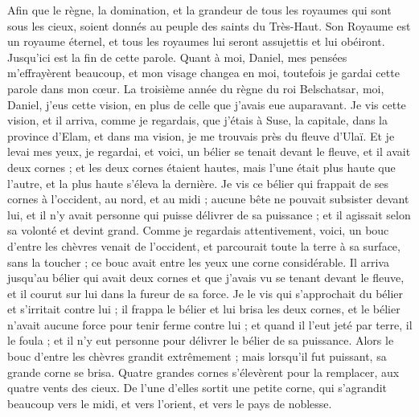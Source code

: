 \begin{multicols}{2}
Afin que le règne, la domination, et la grandeur de tous les royaumes qui sont sous les cieux, soient donnés au peuple des saints du Très-Haut. Son Royaume est un royaume éternel, et tous les royaumes lui seront assujettis et lui obéiront.
Jusqu'ici est la fin de cette parole. Quant à moi, Daniel, mes pensées m'effrayèrent beaucoup, et mon visage changea en moi, toutefois je gardai cette parole dans mon cœur.
\VerseOne{}La troisième année du règne du roi Belschatsar, moi, Daniel, j'eus cette vision, en plus de celle que j'avais eue auparavant.
Je vis cette vision, et il arriva, comme je regardais, que j'étais à Suse, la capitale, dans la province d'Elam, et dans ma vision, je me trouvais près du fleuve d'Ulaï.
Et je levai mes yeux, je regardai, et voici, un bélier se tenait devant le fleuve, et il avait deux cornes ; et les deux cornes étaient hautes, mais l'une était plus haute que l'autre, et la plus haute s'éleva la dernière.
Je vis ce bélier qui frappait de ses cornes à l'occident, au nord, et au midi ; aucune bête ne pouvait subsister devant lui, et il n'y avait personne qui puisse délivrer de sa puissance ; et il agissait selon sa volonté et devint grand.
Comme je regardais attentivement, voici, un bouc d'entre les chèvres venait de l'occident, et parcourait toute la terre à sa surface, sans la toucher ; ce bouc avait entre les yeux une corne considérable.
Il arriva jusqu'au bélier qui avait deux cornes et que j'avais vu se tenant devant le fleuve, et il courut sur lui dans la fureur de sa force.
Je le vis qui s'approchait du bélier et s'irritait contre lui ; il frappa le bélier et lui brisa les deux cornes, et le bélier n'avait aucune force pour tenir ferme contre lui ; et quand il l'eut jeté par terre, il le foula ; et il n'y eut personne pour délivrer le bélier de sa puissance.
Alors le bouc d'entre les chèvres grandit extrêmement ; mais lorsqu'il fut puissant, sa grande corne se brisa. Quatre grandes cornes s'élevèrent pour la remplacer, aux quatre vents des cieux.
De l'une d'elles sortit une petite corne, qui s'agrandit beaucoup vers le midi, et vers l'orient, et vers le pays de noblesse.

\end{multicols}
